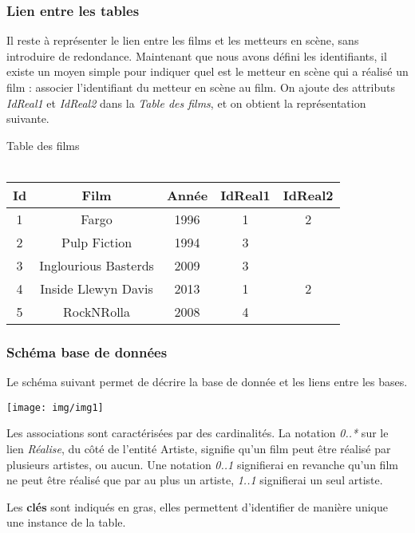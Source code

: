 \begin{frame}[fragile]
\frametitle{Lien entre les tables}

Il reste à représenter le lien entre les films et les metteurs en scène, sans introduire de redondance.
Maintenant que nous avons défini les identifiants, il existe un moyen simple pour indiquer quel est le
metteur en scène qui a réalisé un film : associer l'identifiant du metteur en scène au film. On ajoute des attributs \textit{IdReal1} et \textit{IdReal2} dans la \textit{Table des films}, et on obtient la représentation suivante.

\begin{center}
Table des films \\ ~\ \\
\begin{tabular}{|c|c|c|c|c|}
\hline
\textbf{Id} & \textbf{Film} & \textbf{Année} & \textbf{IdReal1} & \textbf{IdReal2}\\
\hline
1 & Fargo & 1996 & 1 & 2\\
\hline
2 & Pulp Fiction & 1994 & 3 & \\
\hline
3 & Inglourious Basterds & 2009 & 3 &  \\
\hline
4 & Inside Llewyn Davis & 2013 & 1 & 2\\
\hline
5 & RockNRolla & 2008 & 4 & \\
\hline
\end{tabular}
\end{center}
\end{frame}

\begin{frame}[fragile]
\frametitle{Schéma base de données}

Le schéma suivant permet de décrire la base de donnée et les liens entre les bases.

\begin{center}
 \texttt{[image: img/img1]}
\end{center}

Les associations sont caractérisées par des cardinalités. La notation \textit{0..*} sur le lien \textit{Réalise}, du côté de l'entité Artiste, signifie qu'un film peut être réalisé par plusieurs artistes, ou aucun. Une notation \textit{0..1} signifierai en revanche qu'un film ne peut être réalisé que par au plus un artiste, \textit{1..1} signifierai un seul artiste.

Les \textbf{clés} sont indiqués en gras, elles permettent d'identifier de manière unique une instance de la table.
\end{frame}

